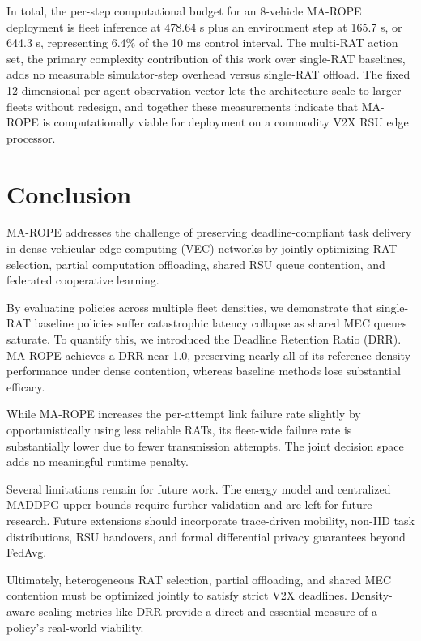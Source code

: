 \documentclass[journal,10pt,twocolumn]{IEEEtran}
\begin{document}
In total, the per-step computational budget for an 8-vehicle MA-ROPE deployment is fleet inference at 478.64 \textmu s plus an environment step at 165.7 \textmu s, or 644.3 \textmu s, representing 6.4\% of the 10 ms control interval. The multi-RAT action set, the primary complexity contribution of this work over single-RAT baselines, adds no measurable simulator-step overhead versus single-RAT offload. The fixed 12-dimensional per-agent observation vector lets the architecture scale to larger fleets without redesign, and together these measurements indicate that MA-ROPE is computationally viable for deployment on a commodity V2X RSU edge processor.



\section{Conclusion}

MA-ROPE addresses the challenge of preserving deadline-compliant task delivery in dense vehicular edge computing (VEC) networks by jointly optimizing RAT selection, partial computation offloading, shared RSU queue contention, and federated cooperative learning. 

By evaluating policies across multiple fleet densities, we demonstrate that single-RAT baseline policies suffer catastrophic latency collapse as shared MEC queues saturate. To quantify this, we introduced the Deadline Retention Ratio (DRR). MA-ROPE achieves a DRR near 1.0, preserving nearly all of its reference-density performance under dense contention, whereas baseline methods lose substantial efficacy.

While MA-ROPE increases the per-attempt link failure rate slightly by opportunistically using less reliable RATs, its fleet-wide failure rate is substantially lower due to fewer transmission attempts. The joint decision space adds no meaningful runtime penalty.

Several limitations remain for future work. The energy model and centralized MADDPG upper bounds require further validation and are left for future research. Future extensions should incorporate trace-driven mobility, non-IID task distributions, RSU handovers, and formal differential privacy guarantees beyond FedAvg.

Ultimately, heterogeneous RAT selection, partial offloading, and shared MEC contention must be optimized jointly to satisfy strict V2X deadlines. Density-aware scaling metrics like DRR provide a direct and essential measure of a policy's real-world viability.




\end{document}
